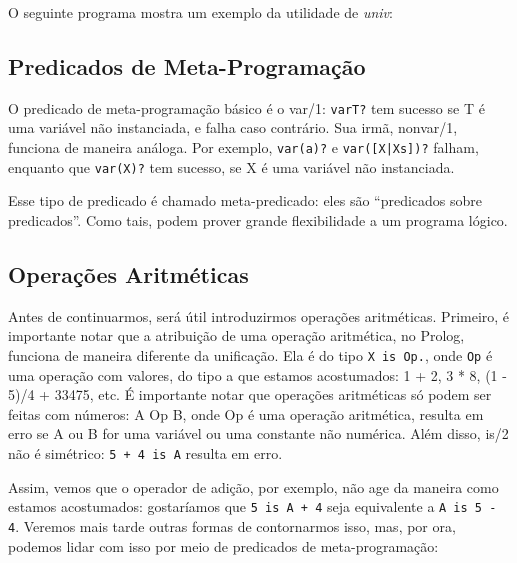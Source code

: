 \documentclass{article}
\theoremstyle{remark}
\theoremstyle{theorem}
\begin{document}
O seguinte programa mostra um exemplo da utilidade de \textit{univ}:



\subsection{Predicados de Meta-Programação}

O predicado de meta-programação básico é o var/1: {\tt var{T}?} tem sucesso se T é uma variável não instanciada, e falha caso contrário. Sua irmã, nonvar/1, funciona de maneira análoga. Por exemplo, {\tt var(a)?} e {\tt var([X|Xs])?} falham, enquanto que {\tt var(X)?} tem sucesso, se X é uma variável não instanciada.

Esse tipo de predicado é chamado meta-predicado: eles são ``predicados sobre predicados''. Como tais, podem prover grande flexibilidade a um programa lógico.


\subsection{Operações Aritméticas}


Antes de continuarmos, será útil introduzirmos operações aritméticas. Primeiro, é importante notar que a atribuição de uma operação aritmética, no Prolog, funciona de maneira diferente da unificação. Ela é do tipo {\tt X is Op.}, onde {\tt Op} é uma operação com valores, do tipo a que estamos acostumados: 1 + 2, 3 * 8, (1 - 5)/4 + 33475, etc. É importante notar que operações aritméticas só podem ser feitas com números: A Op B, onde Op é  uma operação aritmética, resulta em erro se
A ou B for uma variável ou uma constante não numérica. Além disso, is/2 não é simétrico: {\tt 5 + 4 is A} resulta em erro.

Assim, vemos que o operador de adição, por exemplo, não age da maneira como estamos acostumados: gostaríamos que {\tt 5 is A + 4} seja equivalente a {\tt A is 5 - 4}. Veremos mais tarde outras formas de contornarmos isso, mas, por ora, podemos lidar com isso por meio de predicados de meta-programação:
\\


\end{document}
